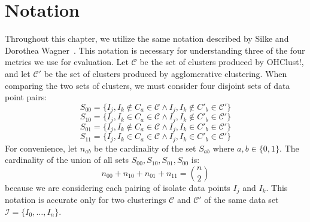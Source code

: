 \documentclass[12pt]{ucthesis}
\begin{document}
   \section{Notation}\label{sec:notation}
      Throughout this chapter, we utilize the same notation described by Silke
      and Dorothea Wagner~\cite{Wagner:Overview}. This notation is necessary
      for understanding three of the four metrics we use for evaluation. Let
      $\mathcal{C}$ be the set of clusters produced by \textsf{OHClust!}, and
      let $\mathcal{C}'$ be the set of clusters produced by
      \textsf{agglomerative clustering}. When comparing the two sets of
      clusters, we must consider four disjoint sets of data point pairs:
      $$
        S_{00} = \lbrace I_{j}, I_{k} \not\in C_{a} \in \mathcal{C}
                           \land   I_{j}, I_{k} \not\in C'_{b} \in \mathcal{C}' \rbrace
      $$
      $$
        S_{10} = \lbrace I_{j}, I_{k} \in C_{a} \in \mathcal{C}
                           \land   I_{j}, I_{k} \not\in C'_{b} \in \mathcal{C}' \rbrace
      $$
      $$
        S_{01} = \lbrace I_{j}, I_{k} \not\in C_{a} \in \mathcal{C}
                           \land   I_{j}, I_{k} \in C'_{b} \in \mathcal{C}' \rbrace
      $$
      $$
        S_{11} = \lbrace I_{j}, I_{k} \in C_{a} \in \mathcal{C}
                           \land   I_{j}, I_{k} \in C'_{b} \in \mathcal{C}' \rbrace
      $$
      For convenience, let $n_{ab}$ be the cardinality of the set
      $S_{ab}$ where $a,b \in \{0, 1\}$. The cardinality of the union of all
      sets $S_{00}, S_{10}, S_{01}, S_{00}$ is:
      $$n_{00} + n_{10} + n_{01} + n_{11} = {\binom{n}{2}}$$
      because we are considering each pairing of isolate data points $I_{j}$
      and $I_{k}$. This notation is accurate only for two clusterings
      $\mathcal{C}$ and $\mathcal{C}'$ of the same data set $\mathcal{I} =
      \lbrace I_{0}, \ldots, I_{n} \rbrace$.
\end{document}

